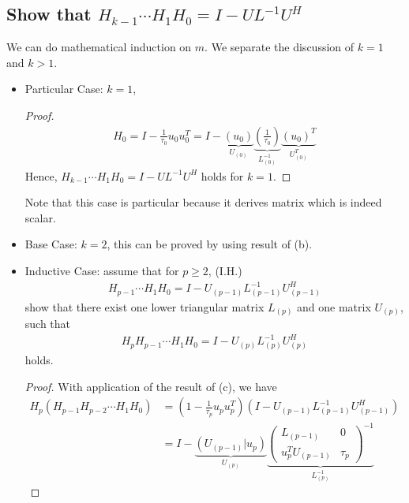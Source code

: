 \documentclass[11pt,a4paper]{article}
\begin{document}
\subsection{Show that $H_{k-1} \cdots H_1 H_0 = I - UL^{-1} U^H$}
We can do mathematical induction on $m$. We separate the discussion of $k = 1$
and $k > 1$. 
\begin{itemize}
    \item Particular Case: $k=1$, 
        \begin{proof}
        \begin{align}
            H_0 = I - \frac{1}{\tau_0} u_0 u_0^T 
            = I - \underbrace{(u_0)}_{U_{(0)}} 
        \underbrace{(\frac{1}{\tau_0})}_{L^{-1}_{(0)}} 
        \underbrace{(u_0)^T}_{U_{(0)}^T}
        \end{align}
        Hence, $H_{k-1} \cdots H_1 H_0 = I - UL^{-1} U^H$ holds for $k=1$.
    \end{proof}
    Note that this case is particular because it derives matrix which is
    indeed scalar. 
\item Base Case: $k = 2$, this can be proved by using result of (b). 
\item Inductive Case: assume that for $p\geq 2$, (I.H.)
        \begin{align}
            H_{p-1} \cdots H_1 H_0 = I - U_{(p-1)} L^{-1}_{(p-1)} U^H_{(p-1)}
        \end{align} 
        show that there exist one lower triangular matrix $L_{(p)}$ and one
         matrix $U_{(p)}$, such that
        \begin{align}
            H_p H_{p-1} \cdots H_1 H_0 = I - U_{(p)}L^{-1}_{(p)} U^H_{(p)}
        \end{align} 
        holds.
        \begin{proof}
            With application of the result of (c), we have
            \begin{align}
                H_p (H_{p-1} H_{p-2} \cdots H_{1} H_{0}) 
                &= (1 - \frac{1}{\tau_p} u_p u_p^T) (I - U_{(p-1)} L^{-1}_{(p-1)} U^H_{(p-1)}) \\
                &= I - \underbrace{ (U_{(p-1)} | u_p) }_{ U_{(p)} }
                \underbrace{
                \left( \begin{array}{c|c} 
                        L_{(p-1)} & 0 \\ \hline
                        u_p^T U_{(p-1)} & \tau_p
                    \end{array} \right)^{-1}
            }_{ L_{(p)}^{-1} }

\end{align}
\end{proof}
\end{itemize}
\end{document}
